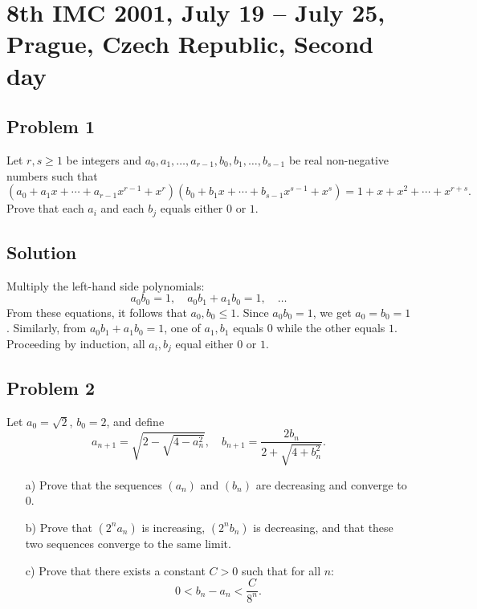 \documentclass{article}
\begin{document}
\pagestyle{plain}

\section*{8th IMC 2001, July 19 -- July 25, Prague, Czech Republic, Second day}

\subsection*{Problem 1}
Let $r, s \geq 1$ be integers and $a_0, a_1, \dots, a_{r-1}, b_0, b_1, \dots, b_{s-1}$ be real non-negative numbers such that
\[
(a_0 + a_1x + \cdots + a_{r-1}x^{r-1} + x^r)(b_0 + b_1x + \cdots + b_{s-1}x^{s-1} + x^s) = 1 + x + x^2 + \cdots + x^{r+s}.
\]
Prove that each $a_i$ and each $b_j$ equals either $0$ or $1$.

\subsection*{Solution}
Multiply the left-hand side polynomials:
\[
a_0 b_0 = 1, \quad a_0 b_1 + a_1 b_0 = 1, \quad \dots
\]
From these equations, it follows that $a_0, b_0 \leq 1$. Since $a_0 b_0 = 1$, we get $a_0 = b_0 = 1$. Similarly, from $a_0 b_1 + a_1 b_0 = 1$, one of $a_1, b_1$ equals $0$ while the other equals $1$. Proceeding by induction, all $a_i, b_j$ equal either $0$ or $1$.

\subsection*{Problem 2}
Let $a_0 = \sqrt{2}$, $b_0 = 2$, and define
\[
a_{n+1} = \sqrt{2 - \sqrt{4 - a_n^2}}, \quad
b_{n+1} = \frac{2b_n}{2 + \sqrt{4 + b_n^2}}.
\]
\begin{itemize}
    \item[a)] Prove that the sequences $(a_n)$ and $(b_n)$ are decreasing and converge to $0$.
    \item[b)] Prove that $(2^n a_n)$ is increasing, $(2^n b_n)$ is decreasing, and that these two sequences converge to the same limit.
    \item[c)] Prove that there exists a constant $C>0$ such that for all $n$:
\[
0 < b_n - a_n < \frac{C}{8^n}.
\]
\end{itemize}
\end{document}
